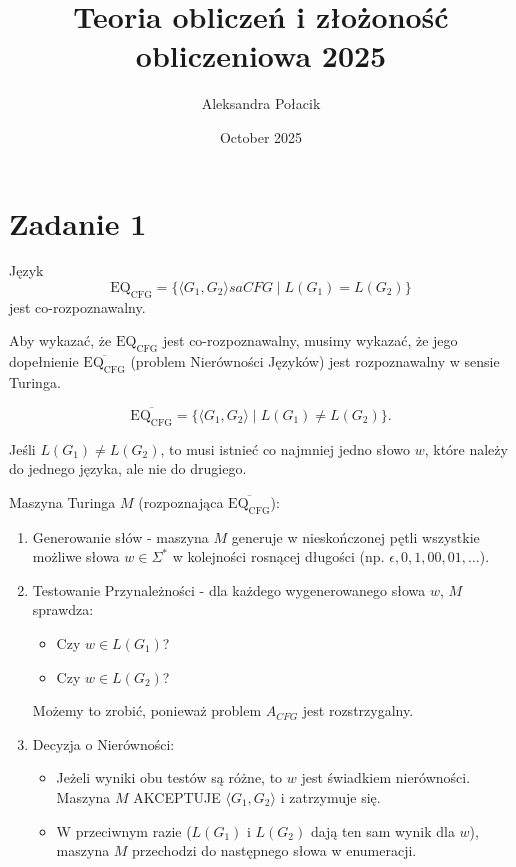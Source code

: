 \documentclass{article}
\title{Teoria obliczeń i złożoność obliczeniowa 2025}
\author{Aleksandra Połacik}
\date{October 2025}
\begin{document}
\maketitle

\section{Zadanie 1}
Język
\[
\mathrm{EQ_{CFG}}=\{\langle G_1,G_2\rangle sa CFG \mid L(G_1)=L(G_2)\}
\]
jest co-rozpoznawalny.


Aby wykazać, że $\mathrm{EQ_{CFG}}$ jest co-rozpoznawalny, musimy wykazać, że jego dopełnienie $\overline{\mathrm{EQ_{CFG}}}$ (problem Nierówności Języków) jest rozpoznawalny w sensie Turinga.

\[
\overline{\mathrm{EQ_{CFG}}}=\{\langle G_1,G_2\rangle \mid L(G_1)\neq L(G_2)\}.
\]

Jeśli $L(G_1) \neq L(G_2)$, to musi istnieć co najmniej jedno słowo $w$, które należy do jednego języka, ale nie do drugiego.

Maszyna Turinga $M$ (rozpoznająca $\overline{\mathrm{EQ_{CFG}}}$):

\begin{enumerate}
    \item Generowanie słów - maszyna $M$ generuje w nieskończonej pętli wszystkie możliwe słowa $w \in \Sigma^*$ w kolejności rosnącej długości (np. $\epsilon, 0, 1, 00, 01, \dots$).

    \item Testowanie Przynależności - dla każdego wygenerowanego słowa $w$, $M$ sprawdza:
    \begin{itemize}
        \item Czy $w \in L(G_1)$?
        \item Czy $w \in L(G_2)$?
    \end{itemize}
    \quad Możemy to zrobić, ponieważ problem $A_{CFG}$ jest rozstrzygalny.

    \item Decyzja o Nierówności:
    \begin{itemize}
        \item Jeżeli wyniki obu testów są różne, to $w$ jest świadkiem nierówności. Maszyna $M$ AKCEPTUJE $\langle G_1,G_2\rangle$ i zatrzymuje się.
        \item W przeciwnym razie ($L(G_1)$ i $L(G_2)$ dają ten sam wynik dla $w$), maszyna $M$ przechodzi do następnego słowa w enumeracji.
    \end{itemize}
\end{enumerate}
\end{document}
